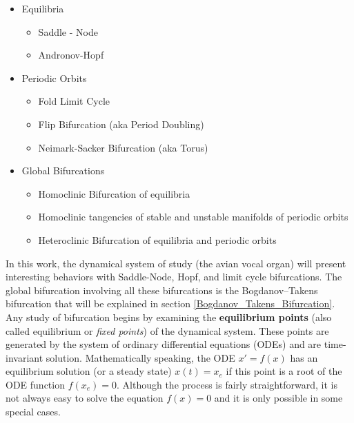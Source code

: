 \begin{itemize}
    \item Equilibria
    \begin{itemize}
    \item Saddle - Node
    \item Andronov-Hopf 
    \end{itemize}
    
    \item Periodic Orbits
    \begin{itemize}
    \item Fold Limit Cycle
    \item Flip Bifurcation (aka Period Doubling)
    \item Neimark-Sacker Bifurcation (aka Torus)
    \end{itemize}
    
    
    \item Global Bifurcations
    \begin{itemize}
    \item Homoclinic Bifurcation of equilibria
    \item  Homoclinic tangencies of stable and unstable manifolds of periodic orbits
    \item Heteroclinic Bifurcation of equilibria and periodic orbits
    \end{itemize}
    
\end{itemize}



In this work, the dynamical system of study (the avian vocal organ) will present interesting behaviors with Saddle-Node, Hopf, and limit cycle bifurcations. The global bifurcation involving all these bifurcations is the 
Bogdanov–Takens bifurcation that will be explained in section \ref{Bogdanov_Takens_Bifurcation}.\\

Any study of bifurcation begins by examining the \textbf{equilibrium points} (also called equilibrium or \textit{fixed points}) of the dynamical system. These points are generated by the system of ordinary differential equations (ODEs) and are time-invariant solution. Mathematically speaking, the ODE $x'=f(x)$ has an equilibrium solution (or a steady state) $x(t)=x_e$ if this point is a root of the ODE function $f(x_e)=0$. Although the process is fairly straightforward, it is not always easy to solve the equation $f(x)=0$ and it is only  possible in some special cases. \cite{bifurcation}

